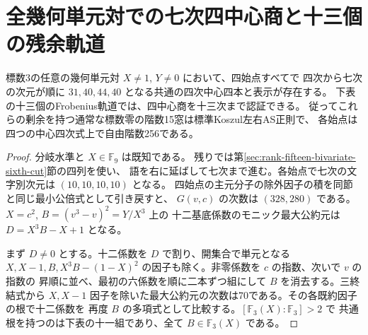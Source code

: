 \section{全幾何単元対での七次四中心商と十三個の残余軌道}
\label{sec:rank-fifteen-bivariate-seventh-cut}
\begin{theorem}
標数3の任意の幾何単元対 $X\ne1$, $Y\ne0$ において、四始点すべてで
四次から七次の次元が順に $31,40,44,40$ となる共通の四次中心四本と表示が存在する。
下表の十三個のFrobenius軌道では、四中心商を十三次まで認証できる。
従ってこれらの剰余を持つ通常な標数零の階数15窓は標準Koszul左右AS正則で、
各始点は四つの中心四次式上で自由階数256である。
\end{theorem}
\begin{proof}
分岐水準と $X\in\mathbb F_9$ は既知である。
残りでは第\ref{sec:rank-fifteen-bivariate-sixth-cut}節の四列を使い、
語を右に延ばして七次まで進む。各始点で七次の文字別次元は $(10,10,10,10)$ となる。
四始点の主元分子の除外因子の積を同節と同じ最小公倍式として引き戻すと、
$G(v,c)$ の次数は $(328,280)$ である。$X=c^2$, $B=(v^3-v)^2=Y/X^3$ 上の
十二基底係数のモニック最大公約元は $D=X^3B-X+1$ となる。

まず $D\ne0$ とする。十二係数を $D$ で割り、開集合で単元となる
$X,X-1,B,X^3B-(1-X)^2$ の因子も除く。非零係数を $c$ の指数、次いで $v$ の指数の
昇順に並べ、最初の六係数を順に二本ずつ組にして $B$ を消去する。三終結式から
$X,X-1$ 因子を除いた最大公約元の次数は70である。その各既約因子の根で十二係数を
再度 $B$ の多項式として比較する。$[\mathbb F_3(X):\mathbb F_3]>2$ で
共通根を持つのは下表の十一組であり、全て $B\in\mathbb F_3(X)$ である。


\end{proof}
